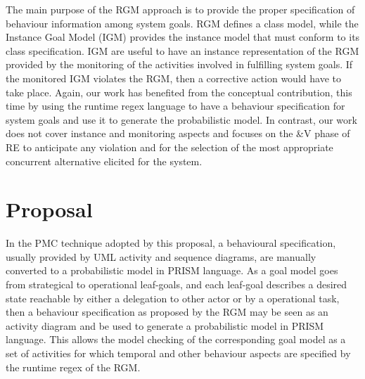 The main purpose of the RGM approach is to provide the proper specification of behaviour information among system goals. RGM defines a class model, while the Instance Goal Model (IGM) provides the instance model that must conform to its class specification. IGM are useful to have an instance representation of the RGM provided by the monitoring of the activities involved in fulfilling system goals. If the monitored IGM violates the RGM, then a corrective action would have to take place. Again, our work has benefited from the conceptual contribution, this time by using the runtime regex language to have a behaviour specification for system goals and use it to generate the probabilistic model. In contrast, our work does not cover instance and monitoring aspects and focuses on the \&V phase of RE to anticipate any violation and for the selection of the most appropriate concurrent alternative elicited for the system.

\chapter{Proposal}\label{ch_proposal}

In the PMC technique adopted by this proposal, a behavioural specification, usually provided by UML activity and sequence diagrams, are manually converted to a probabilistic model in PRISM language. As a goal model goes from strategical to operational leaf-goals, and each leaf-goal describes a desired state reachable by either a delegation to other actor or by a operational task, then a behaviour specification as proposed by the RGM may be seen as an activity diagram and be used to generate a probabilistic model in PRISM language. This allows the model checking of the corresponding goal model as a set of activities for which temporal and other behaviour aspects are specified by the runtime regex of the RGM.